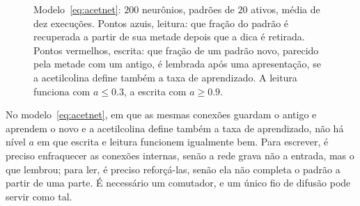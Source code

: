 \begin{figure}[t]
\centering
{}
\caption{Modelo~\eqref{eq:acetnet}: $200$ neurônios, padrões de $20$ ativos, média de dez execuções. Pontos azuis, leitura: que fração do padrão é recuperada a partir de sua metade depois que a dica é retirada. Pontos vermelhos, escrita: que fração de um padrão novo, parecido pela metade com um antigo, é lembrada após uma apresentação, se a acetilcolina define também a taxa de aprendizado. A leitura funciona com $a\le0.3$, a escrita com $a\ge0.9$.}
\label{fig:acetsim}
\end{figure}

\begin{keyblock}
\begin{proposition}
\label{prop:writeread}
No modelo~\eqref{eq:acetnet}, em que as mesmas conexões guardam o antigo e aprendem o novo e a acetilcolina define também a taxa de aprendizado, não há nível $a$ em que escrita e leitura funcionem igualmente bem. Para escrever, é preciso enfraquecer as conexões internas, senão a rede grava não a entrada, mas o que lembrou; para ler, é preciso reforçá-las, senão ela não completa o padrão a partir de uma parte. É necessário um comutador, e um único fio de difusão pode servir como tal.
\end{proposition}
\end{keyblock}

